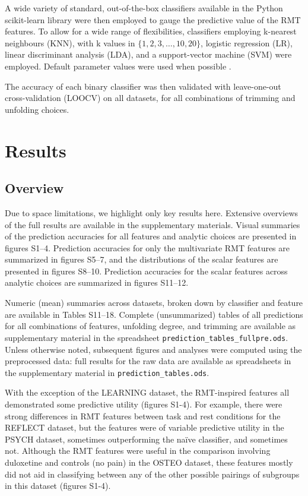 \documentclass[NETN,manuscript]{stjour-new}
\begin{document}
A wide variety of standard, out-of-the-box classifiers available in the Python scikit-learn library
\citep{pedregosaScikitlearnMachineLearning2011} were then employed to gauge the predictive value of
the RMT features. To allow for a wide range of flexibilities, classifiers employing k-nearest
neighbours (KNN), with k values in \(\{1, 2, 3, \dots, 10, 20\}\), logistic regression (LR), linear
discriminant analysis (LDA), and a support-vector machine (SVM) were employed. Default parameter
values were used when possible \citep[see][for precise function calls used]{bergerderekm.DMBergerRandommatrixfmriV02020}.

The accuracy of each binary classifier was then validated with leave-one-out cross-validation
(LOOCV) on all datasets, for all combinations of trimming and unfolding choices.

\section{Results}

\subsection{Overview}
Due to space limitations, we highlight only key results here. Extensive overviews of the full
results are available in the supplementary materials. Visual summaries of the prediction accuracies
for all features and analytic choices are presented in figures S1--4. Prediction accuracies for only the
multivariate RMT features are summarized in figures S5--7, and the distributions of the scalar features
are presented in figures S8--10. Prediction accuracies for the scalar features across analytic choices
are summarized in figures S11--12.

Numeric (mean) summaries across datasets, broken down by classifier and feature are available in
Tables S11--18. Complete (unsummarized) tables of all predictions for all combinations of features,
unfolding degree, and trimming are available as supplementary material in the spreadsheet
\texttt{prediction\_tables\_fullpre.ods}. Unless otherwise noted, subsequent figures and analyses were
computed using the preprocessed data: full results for the raw data are available as spreadsheets in
the supplementary material in \texttt{prediction\_tables.ods}.

With the exception of the LEARNING dataset, the RMT-inspired features all demonstrated some
predictive utility (figures S1-4). For example, there were strong differences in RMT features between
task and rest conditions for the REFLECT dataset, but the features were of variable predictive
utility in the PSYCH dataset, sometimes outperforming the naïve classifier, and sometimes not.
Although the RMT features were useful in the comparison involving duloxetine and controls (no pain)
in the OSTEO dataset, these features mostly did not aid in classifying between any of the other
possible pairings of subgroups in this dataset (figures S1-4).
\end{document}
